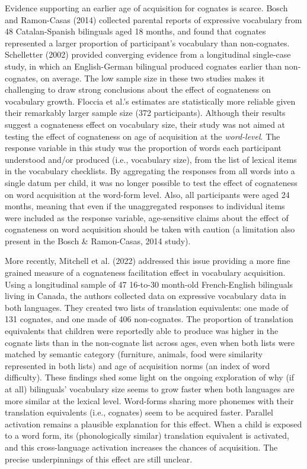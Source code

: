 \documentclass[
  man,
  floatsintext,
  colorlinks=true,linkcolor=blue,citecolor=blue,urlcolor=blue,biblatex]{apa7}
\begin{document}
Evidence supporting an earlier age of acquisition for cognates is
scarce. Bosch and Ramon-Casas (2014) collected parental reports of
expressive vocabulary from 48 Catalan-Spanish bilinguals aged 18 months,
and found that cognates represented a larger proportion of participant's
vocabulary than non-cognates. Schelletter (2002) provided converging
evidence from a longitudinal single-case study, in which an
English-German bilingual produced cognates earlier than non-cognates, on
average. The low sample size in these two studies makes it challenging
to draw strong conclusions about the effect of cognateness on vocabulary
growth. Floccia et al.'s estimates are statistically more reliable given
their remarkably larger sample size (372 participants). Although their
results suggest a cognateness effect on vocabulary size, their study was
not aimed at testing the effect of cognateness on age of acquisition at
the \emph{word-level}. The response variable in this study was the
proportion of words each participant understood and/or produced (i.e.,
vocabulary size), from the list of lexical items in the vocabulary
checklists. By aggregating the responses from all words into a single
datum per child, it was no longer possible to test the effect of
cognateness on word acquisition at the word-form level. Also, all
participants were aged 24 months, meaning that even if the unaggregated
responses to individual items were included as the response variable,
age-sensitive claims about the effect of cognateness on word acquisition
should be taken with caution (a limitation also present in the Bosch \&
Ramon-Casas, 2014 study).

More recently, Mitchell et al. (2022) addressed this issue providing a
more fine grained measure of a cognateness facilitation effect in
vocabulary acquisition. Using a longitudinal sample of 47 16-to-30
month-old French-English bilinguals living in Canada, the authors
collected data on expressive vocabulary data in both languages. They
created two lists of translation equivalents: one made of 131 cognates,
and one made of 406 non-cognates. The proportion of translation
equivalents that children were reportedly able to produce was higher in
the cognate lists than in the non-cognate list across ages, even when
both lists were matched by semantic category (furniture, animals, food
were similarity represented in both lists) and age of acquisition norms
(an index of word difficulty). These findings shed some light on the
ongoing exploration of why (if at all) bilinguals' vocabulary size seems
to grow faster when both languages are more similar at the lexical
level. Word-forms sharing more phonemes with their translation
equivalents (i.e., cognates) seem to be acquired faster. Parallel
activation remains a plausible explanation for this effect. When a child
is exposed to a word form, its (phonologically similar) translation
equivalent is activated, and this cross-language activation increases
the chances of acquisition. The precise underpinnings of this effect are
still unclear.
\end{document}
